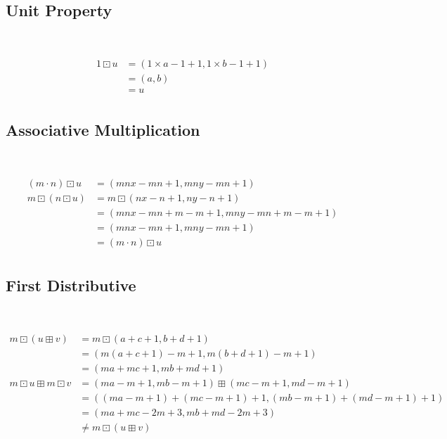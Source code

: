 \documentclass{article}
\begin{document}
\subsection{Unit Property}

~

\begin{equation}
\tag{1.5}
\begin{split}
1 \boxdot u &= (1 \times a -1+1,1\times b-1+1)\\
&=(a,b)\\
&=u\\
\end{split}
\end{equation}

\subsection{Associative Multiplication}

~

\begin{equation}
\tag{1.6}
\begin{split}
(m\cdot n) \boxdot u &= (mnx-mn+1,mny-mn+1)\\
m\boxdot (n\boxdot u) &= m\boxdot (nx-n+1,ny-n+1)\\
&=(mnx-mn+m-m+1,mny-mn+m-m+1)\\
&=(mnx-mn+1,mny-mn+1)\\
&=(m\cdot n) \boxdot u\\
\end{split}
\end{equation}

\subsection{First Distributive}

~

\begin{equation}
\tag{1.7}
\begin{split}
m \boxdot (u \boxplus v)&= m\boxdot(a+c+1,b+d+1)\\
&=(m(a+c+1)-m+1,m(b+d+1)-m+1)\\
&=(ma+mc+1,mb+md+1)\\
m \boxdot u \boxplus m\boxdot v&=(ma-m+1,mb-m+1)\boxplus (mc-m+1,md-m+1)\\
&=((ma-m+1)+(mc-m+1)+1,(mb-m+1)+(md-m+1)+1)\\
&=(ma+mc-2m+3,mb+md-2m+3)\\
&\ne m \boxdot (u \boxplus v)\\
\end{split}
\end{equation}
\end{document}
